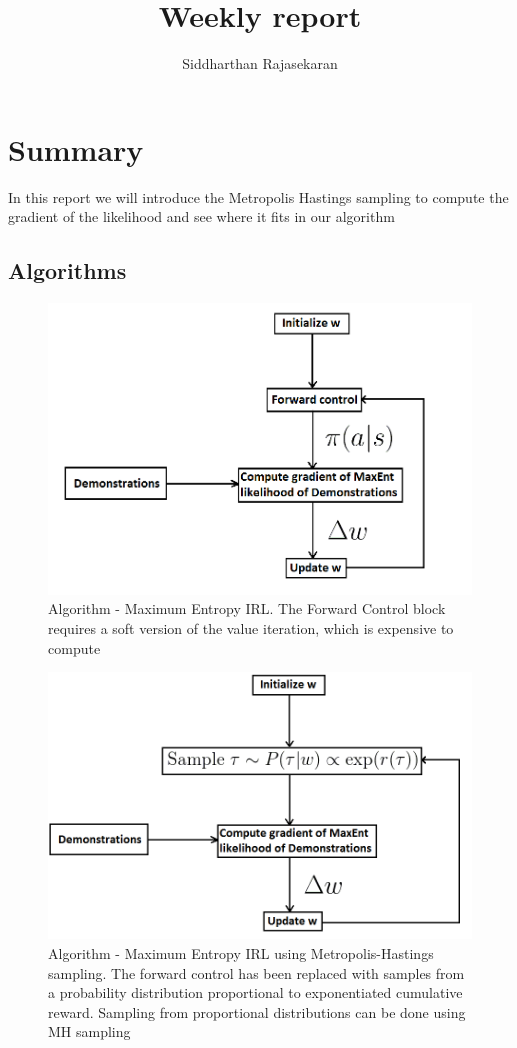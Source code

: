 \documentclass[11pt]{article}
\title{\large \textbf{Weekly report}}
\author{Siddharthan Rajasekaran}
\date{}
\begin{document}
\maketitle

\section{Summary}
In this report we will introduce the Metropolis Hastings sampling to compute the gradient of the likelihood and see where it fits in our algorithm



\subsection{Algorithms}

\begin{figure}[H]
  \begin{center}
    \includegraphics[width=0.7\linewidth]{images/irl.png}
    \caption{Algorithm - Maximum Entropy IRL. The Forward Control block requires a soft version of the value iteration, which is expensive to compute}
    \label{fig:cem}
  \end{center}
\end{figure}

\begin{figure}[H]
  \begin{center}
    \includegraphics[width=0.7\linewidth]{images/mh.png}
    \caption{Algorithm - Maximum Entropy IRL using Metropolis-Hastings sampling. The forward control has been replaced with samples from a probability distribution proportional to exponentiated cumulative reward. Sampling from proportional distributions can be done using MH sampling}
    \label{fig:cem}
  \end{center}
\end{figure}
 
\end{document}
